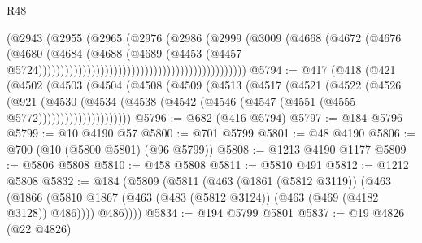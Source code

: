 \begin{lexlean}{R48}
\begin{coremodule}
                                                                  (@2943
                                                                    (@2955
                                                                      (@2965
                                                                        (@2976
                                                                          (@2986
                                                                            (@2999
                                                                              (@3009
                                                                                (@4668
                                                                                  (@4672
                                                                                    (@4676
                                                                                      (@4680
                                                                                        (@4684
                                                                                          (@4688
                                                                                            (@4689
                                                                                              (@4453
                                                                                                (@4457
                                                                                                  @5724)))))))))))))))))))))))))))))))))))))))))))))))
@5794 := @417
    (@418
      (@421
        (@4502
          (@4503
            (@4504
              (@4508
                (@4509
                  (@4513
                    (@4517
                      (@4521
                        (@4522
                          (@4526
                            (@921
                              (@4530
                                (@4534
                                  (@4538
                                    (@4542 (@4546 (@4547 (@4551 (@4555 @5772)))))))))))))))))))))
@5796 := @682 (@416 @5794)
@5797 := @184 @5796
@5799 := @10 @4190 @57
@5800 := @701 @5799
@5801 := @48 @4190
@5806 := @700 (@10 (@5800 @5801) (@96 @5799))
@5808 := @1213 @4190 @1177
@5809 := @5806 @5808
@5810 := @458 @5808
@5811 := @5810 @491
@5812 := @1212 @5808
@5832 := @184
    (@5809
      (@5811
        (@463
          (@1861 (@5812 @3119))
          (@463
            (@1866 (@5810 @1867 (@463 (@483 (@5812 @3124)) (@463 (@469 (@4182 @3128)) @486))))
            @486))))
@5834 := @194 @5799 @5801
@5837 := @19 @4826 (@22 @4826)

\end{coremodule}
\end{lexlean}
